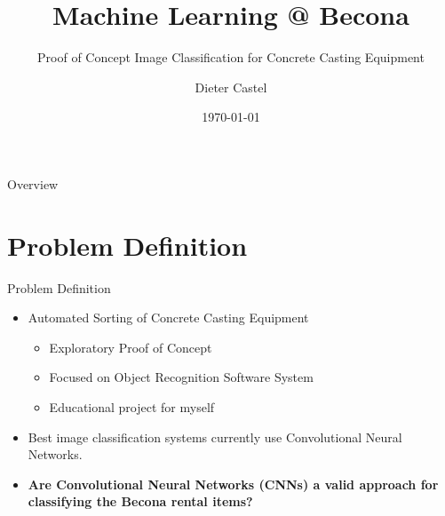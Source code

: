 \documentclass{beamer}
\title{Machine Learning @ Becona}
\subtitle{Proof of Concept Image Classification for Concrete Casting Equipment}
\author{Dieter Castel}
\date{\today}
\begin{document}
\begin{frame}
  \titlepage
\end{frame}

\begin{frame}{Overview}
\tableofcontents
\end{frame}

\section{Problem Definition}
\begin{frame}{Problem Definition}
  \begin{itemize}
	    \item Automated Sorting of Concrete Casting Equipment 
	    \begin{itemize}
	      \item Exploratory Proof of Concept 
	      \item Focused on Object Recognition Software System
	      \item Educational project for myself 
	    \end{itemize}
	    \item Best image classification systems currently use Convolutional Neural Networks.
	    \item \textbf{Are Convolutional Neural Networks (CNNs) a valid approach for classifying the Becona rental items?}
  \end{itemize}
\end{frame}
\end{document}
